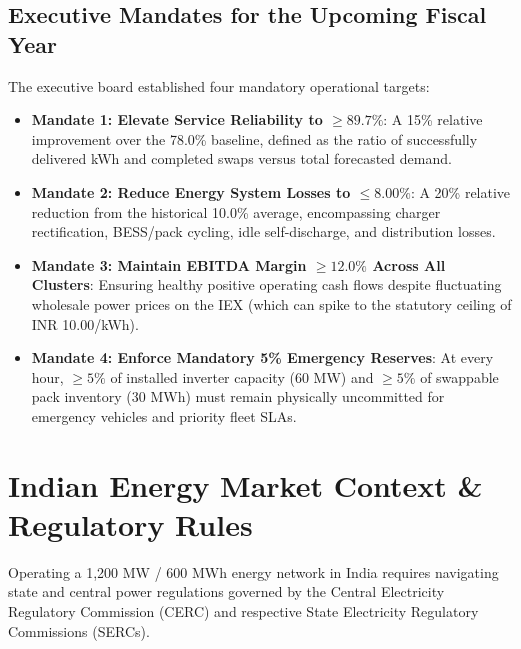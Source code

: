 \documentclass[10.5pt,a4paper]{article}
\begin{document}
\subsection{Executive Mandates for the Upcoming Fiscal Year}
The executive board established four mandatory operational targets:
\begin{itemize}[noitemsep]
    \item \textbf{Mandate 1: Elevate Service Reliability to $\ge 89.7\%$}: A 15\% relative improvement over the 78.0\% baseline, defined as the ratio of successfully delivered kWh and completed swaps versus total forecasted demand.
    \item \textbf{Mandate 2: Reduce Energy System Losses to $\le 8.00\%$}: A 20\% relative reduction from the historical 10.0\% average, encompassing charger rectification, BESS/pack cycling, idle self-discharge, and distribution losses.
    \item \textbf{Mandate 3: Maintain EBITDA Margin $\ge 12.0\%$ Across All Clusters}: Ensuring healthy positive operating cash flows despite fluctuating wholesale power prices on the IEX (which can spike to the statutory ceiling of INR 10.00/kWh).
    \item \textbf{Mandate 4: Enforce Mandatory 5\% Emergency Reserves}: At every hour, $\ge 5\%$ of installed inverter capacity (60 MW) and $\ge 5\%$ of swappable pack inventory (30 MWh) must remain physically uncommitted for emergency vehicles and priority fleet SLAs.
\end{itemize}

\section{Indian Energy Market Context \& Regulatory Rules}

Operating a 1,200 MW / 600 MWh energy network in India requires navigating state and central power regulations governed by the Central Electricity Regulatory Commission (CERC) and respective State Electricity Regulatory Commissions (SERCs).
\end{document}
